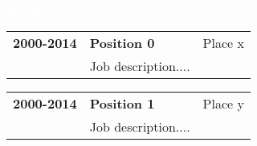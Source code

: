 

\newcommand{\ExperienceEntry}[5]{
\begin{tabular}{ l l r }
  \textbf{\textcolor{materialRedDark}{#1-}}\textbf{\textcolor{materialRed}{#2}}\hspace{20pt} & \textbf{#3} & {\small \textcolor{textLightGray}{#5}}\\
  	& \normalsize #4\\
\end{tabular}
\vspace*{10pt}
}

\LARGE
\noindent\colorbox{materialRed}
{\parbox[c][25pt][c]{\textwidth}{\hspace{15pt}\textcolor{white}{Experience}}} %

\large
\vspace*{10pt}
\ExperienceEntry{2000}{2014}{Position 0}{Job description....}{Place x}

\ExperienceEntry{2000}{2014}{Position 1}{Job description....}{Place y}


\vspace*{5pt}
